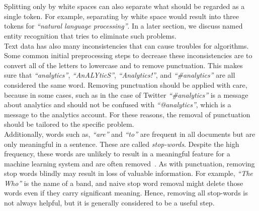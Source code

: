      \\
\\
Splitting only by white spaces can also separate what should be regarded as a single token. For example, separating by white space would result into three tokens for \emph{``natural language processing''}. In a later section, we discuss named entity recognition that tries to eliminate such problems. \\
Text data has also many inconsistencies that can cause troubles for algorithms. Some common initial preprocessing steps to decrease these inconsistencies are to convert all of the letters to lowercase and to remove punctuation.
This makes sure that \emph{``analytics''}, \emph{``AnALYticS''}, \emph{``Analytics!''}, and \emph{``\#analytics''} are all considered the same word. Removing punctuation should be applied with care, because in some cases, such as in the case of Twitter \emph{``\#analytics''} is a message about analytics and should not be confused with \emph{``@analytics''}, which is a message to the analytics account. For these reasons, the removal of punctuation should be tailored to the specific problem.\\
Additionally, words such as, \emph{``are''} and \emph{``to''} are frequent in all documents but are only meaningful in a sentence. These are called \emph{stop-words}. Despite the high frequency, these words are unlikely to result in a meaningful feature for a machine learning system and are often removed~. As with punctuation, removing stop words blindly may result in loss of valuable information. For example, \emph{``The Who''} is the name of a band, and naive stop word removal might delete those words even if they carry significant meaning. Hence, removing all stop-words is not always helpful, but it is generally considered to be a useful step. 
